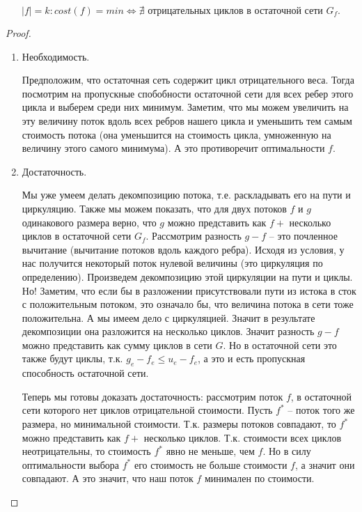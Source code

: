 \begin{lemma}
	\[ 
		|f| = k \colon cost(f) = min \Leftrightarrow \nexists \text{ отрицательных циклов в остаточной сети } G_f.	
	\]
\end{lemma}
\begin{proof}
	\begin{enumerate}
		\item Необходимость. 
		
		Предположим, что остаточная сеть содержит цикл отрицательного веса. Тогда посмотрим на пропускные спобобности остаточной сети для всех ребер этого цикла и выберем среди них минимум. 
		Заметим, что мы можем увеличить на эту величину поток вдоль всех ребров нашего цикла и уменьшить тем самым стоимость потока (она уменьшится на стоимость цикла, умноженную на величину этого самого минимума).
		А это противоречит оптимальности $f$.

		\item Достаточность. 
		
		Мы уже умеем делать декомпозицию потока, т.е. раскладывать его на пути и циркуляцию. Также мы можем показать, что для двух потоков $f$ и $g$ одинакового размера верно, что $g$ можно 
		представить как $f +$ несколько циклов в остаточной сети $G_f$. Рассмотрим разность $g - f$ -- это почленное вычитание (вычитание потоков вдоль каждого ребра). Исходя из условия, у нас получится некоторый
		поток нулевой величины (это циркуляция по определению). Произведем декомпозицию этой циркуляции на пути и циклы. Но! Заметим, что если бы в разложении присутствовали пути из истока в сток с положительным 
		потоком, это означало бы, что величина потока в сети тоже положительна. А мы имеем дело с циркуляцией. Значит в результате декомпозиции она разложится на несколько циклов. Значит разность $g - f$ можно
		представить как сумму циклов в сети $G$. Но в остаточной сети это также будут циклы, т.к. $g_e - f_e \le u_e - f_e$, а это и есть пропускная способность остаточной сети.

		Теперь мы готовы доказать достаточность: рассмотрим поток $f$, в остаточной сети которого нет циклов отрицательной стоимости. Пусть $f^*$ -- поток того же размера, но минимальной стоимости. Т.к.
		размеры потоков совпадают, то $f^*$ можно представить как $f +$ несколько циклов. Т.к. стоимости всех циклов неотрицательны, то стоимость $f^*$ явно не меньше, чем $f$. Но в силу оптимальности выбора $f^*$
		его стоимость не больше стоимости $f$, а значит они совпадают. А это значит, что наш поток $f$ минимален по стоимости. 
	\end{enumerate}
\end{proof}

